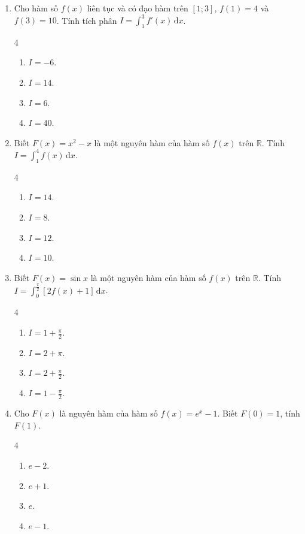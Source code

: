 \documentclass[12pt]{article}
\begin{document}
\begin{enumerate}[label=\textbf{Câu \arabic*.}]
		\item Cho hàm số $f(x)$ liên tục và có đạo hàm trên $[1; 3]$, $f(1) = 4$ và $f(3) = 10$. Tính tích phân $I = \displaystyle \int_{1}^{3} f'(x)\,\mathrm{d}x$.
		\begin{multicols}{4}
			\begin{enumerate}[label=\textbf{\Alph*.}]
				\item $I = -6$.
				\item $I = 14$.
				\item $I = 6$.
				\item $I = 40$.
			\end{enumerate}
		\end{multicols}
		
		\item Biết $F(x) = x^2 - x$ là một nguyên hàm của hàm số $f(x)$ trên $\mathbb{R}$. Tính $I = \displaystyle \int_{1}^{4} f(x)\,\mathrm{d}x$.
		\begin{multicols}{4}
			\begin{enumerate}[label=\textbf{\Alph*.}]
				\item $I = 14$.
				\item $I = 8$.
				\item $I = 12$.
				\item $I = 10$.
			\end{enumerate}
		\end{multicols}
		
		\item Biết $F(x) = \sin x$ là một nguyên hàm của hàm số $f(x)$ trên $\mathbb{R}$. Tính $I = \displaystyle \int_{0}^{\frac{\pi}{2}} [2f(x) + 1]\,\mathrm{d}x$.
		\begin{multicols}{4}
			\begin{enumerate}[label=\textbf{\Alph*.}]
				\item $I = 1 + \frac{\pi}{2}$.
				\item $I = 2 + \pi$.
				\item $I = 2 + \frac{\pi}{2}$.
				\item $I = 1 - \frac{\pi}{2}$.
			\end{enumerate}
		\end{multicols}
		
		\item Cho $F(x)$ là nguyên hàm của hàm số $f(x) = e^x - 1$. Biết $F(0) = 1$, tính $F(1)$.
		\begin{multicols}{4}
			\begin{enumerate}[label=\textbf{\Alph*.}]
				\item $e - 2$.
				\item $e + 1$.
				\item $e$.
				\item $e - 1$.
			\end{enumerate}
		\end{multicols}
		

\end{enumerate}
\end{document}
